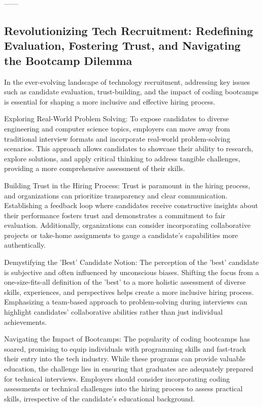 \documentclass[
    a4paper, %
    10pt, %
    unnumberedsections, %
    twoside, %
]{LTJournalArticle}
\begin{document}
——

\subsection{Revolutionizing Tech Recruitment: Redefining Evaluation, Fostering Trust, and Navigating the Bootcamp Dilemma}

In the ever-evolving landscape of technology recruitment, addressing key issues such as candidate evaluation, trust-building, and the impact of coding bootcamps is essential for shaping a more inclusive and effective hiring process.

Exploring Real-World Problem Solving:
To expose candidates to diverse engineering and computer science topics, employers can move away from traditional interview formats and incorporate real-world problem-solving scenarios. This approach allows candidates to showcase their ability to research, explore solutions, and apply critical thinking to address tangible challenges, providing a more comprehensive assessment of their skills.

Building Trust in the Hiring Process:
Trust is paramount in the hiring process, and organizations can prioritize transparency and clear communication. Establishing a feedback loop where candidates receive constructive insights about their performance fosters trust and demonstrates a commitment to fair evaluation. Additionally, organizations can consider incorporating collaborative projects or take-home assignments to gauge a candidate's capabilities more authentically.

Demystifying the 'Best' Candidate Notion:
The perception of the 'best' candidate is subjective and often influenced by unconscious biases. Shifting the focus from a one-size-fits-all definition of the 'best' to a more holistic assessment of diverse skills, experiences, and perspectives helps create a more inclusive hiring process. Emphasizing a team-based approach to problem-solving during interviews can highlight candidates' collaborative abilities rather than just individual achievements.

Navigating the Impact of Bootcamps:
The popularity of coding bootcamps has soared, promising to equip individuals with programming skills and fast-track their entry into the tech industry. While these programs can provide valuable education, the challenge lies in ensuring that graduates are adequately prepared for technical interviews. Employers should consider incorporating coding assessments or technical challenges into the hiring process to assess practical skills, irrespective of the candidate's educational background.
\end{document}
